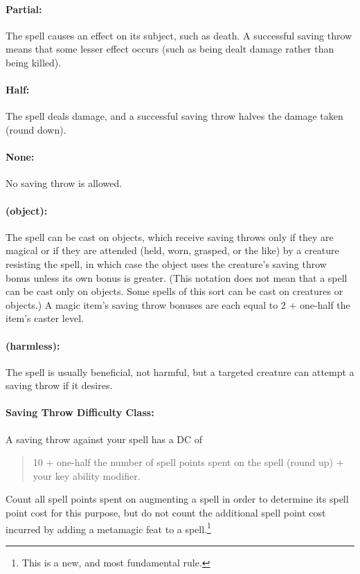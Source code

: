 \paragraph{Partial:} The spell causes an effect on its subject, such as death. A successful saving throw means that some lesser effect occurs (such as being dealt damage rather than being killed).

\paragraph{Half:} The spell deals damage, and a successful saving throw halves the damage taken (round down). 

\paragraph{None:} No saving throw is allowed.

\paragraph{(object):} The spell can be cast on objects, which receive saving throws only if they are magical or if they are attended (held, worn, grasped, or the like) by a creature resisting the spell, in which case the object uses the creature's saving throw bonus unless its own bonus is greater. (This notation does not mean that a spell can be cast only on objects. Some spells of this sort can be cast on creatures or objects.) A magic item's saving throw bonuses are each equal to 2 + one-half the item's caster level.

\paragraph{(harmless):} The spell is usually beneficial, not harmful, but a targeted creature can attempt a saving throw if it desires.

\paragraph{Saving Throw Difficulty Class:} 

A saving throw against your spell has a DC of
\begin{quote}
\centering
\large 
 {10 + one-half the number of spell points spent on the spell (round up) + your key ability modifier.}
\end{quote}
Count all spell points spent on augmenting a spell in order to determine its spell point cost for this purpose, 
but do not count the additional spell point cost incurred by adding a metamagic feat to a spell.\footnote{This is a new, and most fundamental rule.}

